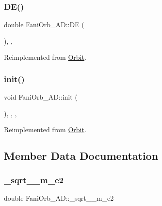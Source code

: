 \subsubsection{\texorpdfstring{D\+E()}{DE()}}
{\footnotesize\ttfamily double Fani\+Orb\+\_\+\+A\+D\+::\+DE (\begin{DoxyParamCaption}{ }\end{DoxyParamCaption})\hspace{0.3cm}{\ttfamily [override]}, {\ttfamily [private]}, {\ttfamily [virtual]}}



Reimplemented from \hyperlink{class_orbit_a9bac8077719791b75d0c962428f8e1b4}{Orbit}.

\mbox{\label{class_fani_orb___a_d_ad75ffb0402507df987305b7a79c8a8d0}} 
\subsubsection{\texorpdfstring{init()}{init()}}
{\footnotesize\ttfamily void Fani\+Orb\+\_\+\+A\+D\+::init (\begin{DoxyParamCaption}{ }\end{DoxyParamCaption})\hspace{0.3cm}{\ttfamily [inline]}, {\ttfamily [override]}, {\ttfamily [private]}, {\ttfamily [virtual]}}



Reimplemented from \hyperlink{class_orbit_ab92aeb9474f9aa26ea000ed2ea8c2c8c}{Orbit}.



\subsection{Member Data Documentation}
\mbox{\label{class_fani_orb___a_d_a04763aac6cf9406b335b818736ba8b06}} 
\subsubsection{\texorpdfstring{\+\_\+sqrt\+\_\+\_\+m\+\_\+e2}{\_sqrt\_1\_m\_e2}}
{\footnotesize\ttfamily double Fani\+Orb\+\_\+\+A\+D\+::\+\_\+sqrt\+\_\+\_\+m\+\_\+e2\hspace{0.3cm}{\ttfamily [private]}}

